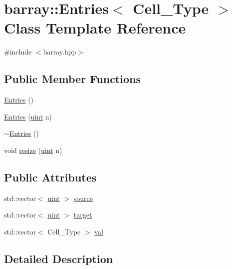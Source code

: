 \hypertarget{classbarray_1_1_entries}{}\section{barray\+:\+:Entries$<$ Cell\+\_\+\+Type $>$ Class Template Reference}
\label{classbarray_1_1_entries}


{\ttfamily \#include $<$barray.\+hpp$>$}

\subsection*{Public Member Functions}
\begin{DoxyCompactItemize}
\item 
\hyperlink{classbarray_1_1_entries_a38e9bfe7feab9af33d872796a8099439}{Entries} ()
\item 
\hyperlink{classbarray_1_1_entries_ae27c7a82b7eb47a011621f63a142f7d4}{Entries} (\hyperlink{namespacebarray_af9756a31953db233f80a9cfe1ef31c32}{uint} n)
\item 
\hyperlink{classbarray_1_1_entries_a811ad3b68c7d5e25930b84d249da1345}{$\sim$\+Entries} ()
\item 
void \hyperlink{classbarray_1_1_entries_a7d4055f1486d513ae80b94ea2d8e105f}{resize} (\hyperlink{namespacebarray_af9756a31953db233f80a9cfe1ef31c32}{uint} n)
\end{DoxyCompactItemize}
\subsection*{Public Attributes}
\begin{DoxyCompactItemize}
\item 
std\+::vector$<$ \hyperlink{namespacebarray_af9756a31953db233f80a9cfe1ef31c32}{uint} $>$ \hyperlink{classbarray_1_1_entries_ab8d603d5371b5c5f354d7a4208771a9a}{source}
\item 
std\+::vector$<$ \hyperlink{namespacebarray_af9756a31953db233f80a9cfe1ef31c32}{uint} $>$ \hyperlink{classbarray_1_1_entries_a6ee07a19fe9412417b6b2394689dd0dc}{target}
\item 
std\+::vector$<$ Cell\+\_\+\+Type $>$ \hyperlink{classbarray_1_1_entries_a76c7dfbfe4c427a061b30155c6f65b47}{val}
\end{DoxyCompactItemize}


\subsection{Detailed Description}
